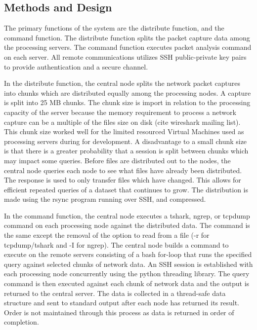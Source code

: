 \documentclass{article}
\begin{document}
\begin{multicols}{2}
\section{Methods and Design}

The primary functions of the system are the distribute function, and the command function. The distribute function splits the packet capture data among the processing servers. The command function executes packet analysis command on each server.  All remote communications utilizes SSH public-private key pairs to provide authentication and a secure channel.  

In the distribute function,  the central node splits the network packet captures into chunks which are distributed equally among the processing nodes.  A capture is split into 25 MB chunks. The chunk size is import in relation to the processing capacity of the server because the memory requirement to process a network capture can be a multiple of the files size on disk (cite wireshark mailing list). This chunk size worked well for the limited resourced Virtual Machines used as processing servers during for development.  A disadvantage to a small chunk size is that there is a greater probability that a session is split between chunks which may impact some queries.  Before files are distributed out to the nodes, the central node queries each node to see what files have already been distributed. The response is used to only transfer files which have changed.  This allows for efficient repeated queries of a dataset that continues to grow. The distribution is made using the rsync program running over SSH, and compressed.     

In the command function, the central node executes a tshark, ngrep, or tcpdump command on each processing node against the distributed data.  The command is the same except the removal of the option to read from a file (-r for tcpdump/tshark and -I for ngrep).  The central node builds a command to execute on the remote servers consisting of a bash for-loop that runs the specified query against selected chunks of network data. An SSH session is established with each processing node concurrently using the python threading library.  The query command is then executed against each chunk of network data and the output is returned to the central server. The data is collected in a thread-safe data structure and sent to standard output after each node has returned its result.  Order is not maintained through this process as data is returned in order of completion.  


\end{multicols}
\end{document}

